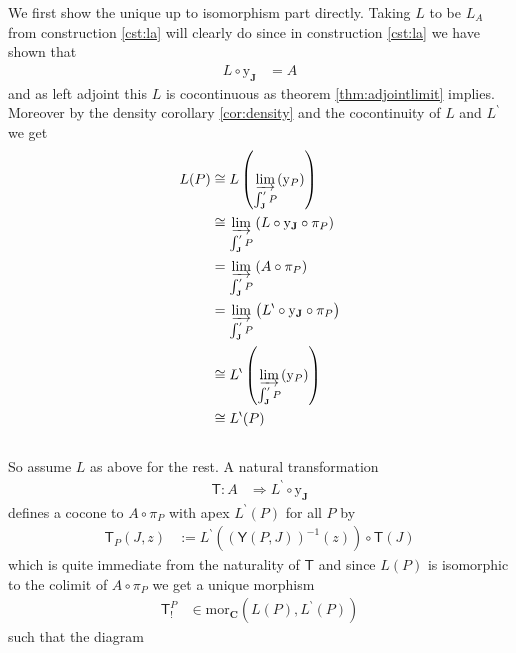 \begin{prf}
We first show the unique up to isomorphism part directly. Taking $L$ to be $L_{A}$ from construction \ref{cst:la} will clearly do since in construction \ref{cst:la} we have shown that
\begin{align*}
  L
  \circ
  \mathrm{y}_{\mathbf{J}}
  &=
  A
\end{align*}
 and as left adjoint this $L$ is cocontinuous as theorem \ref{thm:adjointlimit} implies. Moreover by the density corollary \ref{cor:density} and the cocontinuity of $L$ and $L^{\backprime}$ we get
\begin{align*}
  L(P)
  &\cong
  L
  \left(
    \varinjlim_{\int_{\mathbf{J}}^{\prime}P}(\mathrm{y}_{P})
  \right)
  \\
  &\cong
  \varinjlim_{\int_{\mathbf{J}}^{\prime}P}
  \left(
    L
    \circ
    \mathrm{y}_{\mathbf{J}}
    \circ
    \pi_{P}
  \right)
  \\
  &=
  \varinjlim_{\int_{\mathbf{J}}^{\prime}P}
  \left(
    A
    \circ
    \pi_{P}
  \right)
  \\
  &=
  \varinjlim_{\int_{\mathbf{J}}^{\prime}P}
  \left(
    L^{\backprime}
    \circ
    \mathrm{y}_{\mathbf{J}}
    \circ
    \pi_{P}
  \right)
  \\
  &\cong
  L^{\backprime}
  \left(
    \varinjlim_{\int_{\mathbf{J}}^{\prime}P}(\mathrm{y}_{P})
  \right)
  \\
  &\cong
  L^{\backprime}(P)
\end{align*}
\\
So assume $L$ as above for the rest. A natural transformation
\begin{align*}
  \mathsf{T}
  \colon
  A
  &\Rightarrow
  L^{\backprime}
  \circ
  \mathrm{y}_{\mathbf{J}}
\end{align*}
defines a cocone to $A \circ \pi_{P}$ with apex $L^{\backprime}(P)$ for all $P$ by
\begin{align*}
  \mathsf{T}_{P}(J,z)
  &:=
  L^{\backprime}
  \left(
    (\mathsf{Y}(P,J))^{-1}(z)
  \right)
  \circ
  \mathsf{T}(J)
\end{align*}
which is quite immediate from the naturality of $\mathsf{T}$ and since $L(P)$ is isomorphic to the colimit of $A \circ \pi_{P}$ we get a unique morphism
\begin{align*}
  \mathsf{T}_{!}^{P}
  &\in
  \mathrm{mor}_{\mathbf{C}}
  \left(
    L(P),
    L^{\backprime}(P)
  \right)
\end{align*}
such that the diagram
\[
\begin{tikzcd}[sep=large]

\end{tikzcd}\]
\end{prf}
